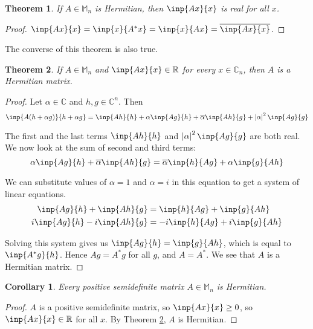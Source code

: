 \documentclass[twofold]{article}
\newcommand*\conj[1]{\overline{#1}}
\newcommand*\adj[1]{#1^*}
\newcommand*\abs[1]{\left \vert #1 \right\vert}
\theoremstyle{plain}
\newtheorem{theorem}{Theorem}
\newtheorem*{corollary}{Corollary}
\theoremstyle{definition}
\theoremstyle{remark}
\begin{document}
\begin{theorem} If \(A \in \mathbb{M}_n\) is Hermitian, then \(\inp{Ax}{x}\) is real for all \(x\). \end{theorem}
\begin{proof} \(\inp{Ax}{x} = \inp{x}{\adj{A}x} = \inp{x}{Ax} = \conj{\inp{Ax}{x}}\). \end{proof}

The converse of this theorem is also true.

\begin{theorem}\label{eig_real_herm} If \(A \in \mathbb{M}_n\) and \(\inp{Ax}{x} \in \mathbb{R}\) for every \(x \in \mathbb{C}_n\), then \(A\) is a Hermitian matrix. \end{theorem}

\begin{proof} Let \(\alpha \in \mathbb{C}\) and \(h, g \in \mathbb{C}^n\). Then
\[\inp{A(h + \alpha g)}{h + \alpha g} = \inp{Ah}{h} + \alpha \inp{Ag}{h} + \conj{\alpha} \inp{Ah}{g} + \abs{\alpha}^2 \inp{Ag}{g} \]

The first and the last terms \(\inp{Ah}{h}\) and \(\abs{\alpha}^2 \inp{Ag}{g}\) are both real. We now look at the sum of second and third terms:
\[\alpha \inp{Ag}{h} + \conj{\alpha} \inp{Ah}{g} = \conj{\alpha} \inp{h}{Ag} + \alpha \inp{g}{Ah} \]

We can substitute values of \(\alpha = 1\) and \(\alpha = i\)  in this equation to get a system of linear equations. 
\begin{equation*}
\begin{aligned}
\inp{Ag}{h}  + \inp{Ah}{g} & =  \inp{h}{Ag}  + \inp{g}{Ah} \\
i \inp{Ag}{h}  - i \inp{Ah}{g}  & = -i \inp{h}{Ag} +  i \inp{g}{Ah} 
\end{aligned}
\end{equation*}

Solving this system gives us \(\inp{Ag}{h} = \inp{g}{Ah}\), which is equal to \(\inp{\adj{A}g}{h}\). Hence \(Ag = \adj{A}g\) for all \(g\), and \(A = \adj{A}\). We see that \(A\) is a Hermitian matrix.
\end{proof}

\begin{corollary}Every positive semidefinite matrix \(A \in \mathbb{M}_n\) is Hermitian.\end{corollary}
\begin{proof} \(A\) is a positive semidefinite matrix, so \(\inp{Ax}{x} \ge 0 \),  so \(\inp{Ax}{x} \in \mathbb{R}\) for all \(x\). By Theorem \ref{eig_real_herm}, \(A\) is Hermitian. \end{proof}
\end{document}
